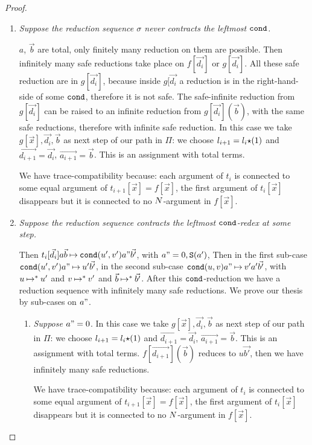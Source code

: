 \begin{proof}
\begin{enumerate}
\begin{enumerate}
\item
  \emph{Suppose the reduction sequence $\sigma$ never contracts the leftmost ${\tt cond}$.}

  $a$, $\vec{b}$ are total, only finitely many reduction on them are possible.
  Then infinitely many safe reductions take place on $f[\vec{d_i}]$ or $g[\vec{d_i}]$. 
  All these safe reduction are in $g[\vec{d_i}]$, because inside $g[\vec{d_i}$ 
  a reduction is in the right-hand-side of some ${\tt cond}$, therefore it is not safe.
  The safe-infinite reduction from $g[\vec{d_i}]$ can be raised to an infinite reduction from 
  $g[\vec{d_i}](\vec{b})$, with the same safe reductions, therefore with infinite safe reduction.
  In this case we take $g[\vec{x}],\vec{d_i},\vec{b}$ as next step of our path in $\Pi$:
  we choose $l_{i+1} = l_i {\star} (1)$ and $\vec{d_{i+1}} = \vec{d_i}$,
  $\vec{a_{i+1}} = \vec{b}$.  This is an assignment with total terms.

  We have trace-compatibility because: 
  each argument of $t_i$ is connected to some equal argument of $t_{i+1}[\vec{x}]=f[\vec{x}]$,
  the first argument of $t_i[\vec{x}]$ disappears but it is connected to no ${N}$-argument in $f[\vec{x}]$.

\item
  \emph{Suppose the reduction sequence contracts the leftmost ${\tt cond}$-redex at some step.}

  Then $t_i[\vec{d_i}]a \vec{b} \mathbin{\mapsto} {\tt cond}(u',v')a"\vec{b'}$, with $a"=0, {\tt S}(a')$,
  Then  in the first sub-case ${\tt cond}(u',v')a" \mathbin{\mapsto} u' \vec{b'}$, in the second sub-case
  ${\tt cond}(u,v)a" \mathbin{\mapsto} v' a' \vec{b'}$, 
  with $u \mathbin{\mapsto}^* u'$ and $v \mathbin{\mapsto}^* v'$ and $\vec{b} \mathbin{\mapsto}^* \vec{b'}$.
  After this ${\tt cond}$-reduction we have a reduction sequence with infinitely many safe reductions.
  We prove our thesis by sub-cases on $a"$.
   

\begin{enumerate}
\item
  \emph{Suppose $a" = 0$}.
   In this case we take $g[\vec{x}],\vec{d_i},\vec{b}$ as next step of our path in $\Pi$:
  we choose $l_{i+1} = l_i {\star} (1)$ and $\vec{d_{i+1}} = \vec{d_i}$,
  $\vec{a_{i+1}} = \vec{b}$. This is an assignment with total terms.
  $f[\vec{d_{i+1}}](\vec{b})$ reduces to $u \vec{b'}$, then we have infinitely many safe reductions.

  We have trace-compatibility because: 
    each argument of $t_i$ is connected to some equal argument of $t_{i+1}[\vec{x}]=f[\vec{x}]$,
    the first argument of $t_i[\vec{x}]$ disappears but it is connected to no ${N}$-argument in $f[\vec{x}]$.


\end{enumerate}
\end{enumerate}
\end{enumerate}
\end{proof}
